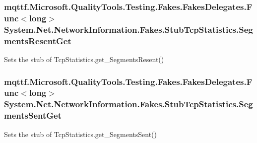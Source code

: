 \hypertarget{class_system_1_1_net_1_1_network_information_1_1_fakes_1_1_stub_tcp_statistics_a0fd252b6deb6119bf83ff6ade2bbd2cb}{
\subsubsection[{Segments\-Resent\-Get}]{\setlength{\rightskip}{0pt plus 5cm}mqttf.\-Microsoft.\-Quality\-Tools.\-Testing.\-Fakes.\-Fakes\-Delegates.\-Func$<$long$>$ System.\-Net.\-Network\-Information.\-Fakes.\-Stub\-Tcp\-Statistics.\-Segments\-Resent\-Get}}\label{class_system_1_1_net_1_1_network_information_1_1_fakes_1_1_stub_tcp_statistics_a0fd252b6deb6119bf83ff6ade2bbd2cb}


Sets the stub of Tcp\-Statistics.\-get\-\_\-\-Segments\-Resent()

\hypertarget{class_system_1_1_net_1_1_network_information_1_1_fakes_1_1_stub_tcp_statistics_af16e64ccd3c2fe8beb98909c3627f774}{
\subsubsection[{Segments\-Sent\-Get}]{\setlength{\rightskip}{0pt plus 5cm}mqttf.\-Microsoft.\-Quality\-Tools.\-Testing.\-Fakes.\-Fakes\-Delegates.\-Func$<$long$>$ System.\-Net.\-Network\-Information.\-Fakes.\-Stub\-Tcp\-Statistics.\-Segments\-Sent\-Get}}\label{class_system_1_1_net_1_1_network_information_1_1_fakes_1_1_stub_tcp_statistics_af16e64ccd3c2fe8beb98909c3627f774}


Sets the stub of Tcp\-Statistics.\-get\-\_\-\-Segments\-Sent()



